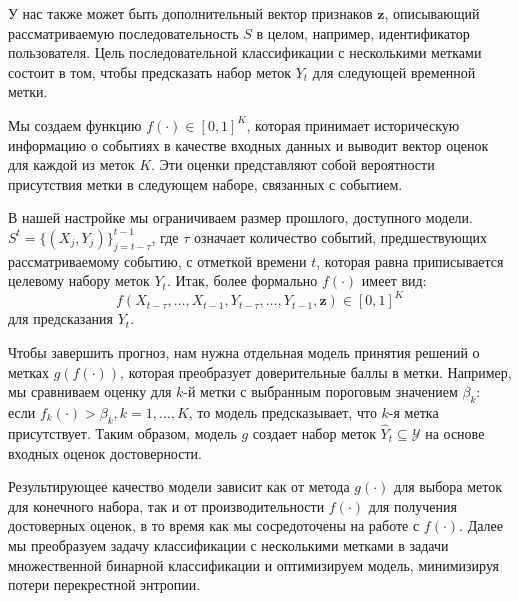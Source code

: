 \documentclass[a4paper, 12pt]{article} %
\begin{document}
У нас также может быть дополнительный вектор признаков $\mathbf{z}$, описывающий рассматриваемую последовательность $S$ в целом, например, идентификатор пользователя.
Цель последовательной классификации с несколькими метками состоит в том, чтобы предсказать набор меток $Y_{t}$ для следующей временной метки.

Мы создаем функцию $f(\cdot) \in [0, 1]^K$, которая принимает историческую информацию о событиях в качестве входных данных и выводит вектор оценок для каждой из меток $K$. Эти оценки представляют собой вероятности присутствия метки в следующем наборе, связанных с событием.

В нашей настройке мы ограничиваем размер прошлого, доступного модели.
$S^t = \{(X_{j}, Y_{j})\}_{j = t - \tau}^{t-1}$, где $\tau$ означает количество событий, предшествующих рассматриваемому событию, с отметкой времени $t$, которая равна приписывается целевому набору меток $Y_{t}$.
Итак, более формально $f(\cdot)$ имеет вид:
$$
f(X_{t - \tau}, \ldots, X_{t-1}, Y_{t - \tau}, \ldots, Y_{t-1}, \textbf{z}) \in [0, 1]^K
$$
для предсказания $Y_{t}$.

Чтобы завершить прогноз, нам нужна отдельная модель принятия решений о метках $g(f(\cdot))$, которая преобразует доверительные баллы в метки.
Например, мы сравниваем оценку для $k$-й метки с выбранным пороговым значением $\beta_k$: если $f_k(\cdot) > \beta_k, k = 1, \dots, K$, то модель предсказывает, что $k$-я метка присутствует. Таким образом, модель $g$ создает набор меток $\hat{Y}_{t} \subseteq \mathcal{Y}$ на основе входных оценок достоверности.

Результирующее качество модели зависит как от метода $g(\cdot)$ для выбора меток для конечного набора, так и от производительности $f(\cdot)$ для получения достоверных оценок, в то время как мы сосредоточены на работе с $f(\cdot)$. Далее мы преобразуем задачу классификации с несколькими метками в задачи множественной бинарной классификации и оптимизируем модель, минимизируя потери перекрестной энтропии.

 


\end{document}
